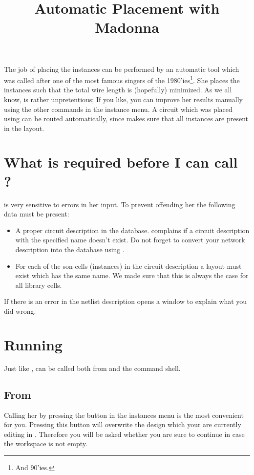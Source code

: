 \title{Automatic Placement with Madonna}
\maketitle
\label{madonna}
The job of placing the instances can be performed by an automatic tool which
was called after one of the most famous singers of the 1980'ies\footnote{And
90'ies.}. She places the instances such that the total wire length is
(hopefully) minimized. As we all know,  is rather unpretentious;
If you like, you can improve her results manually using the other commands in
the instance menu. A circuit which was placed using  can be routed
automatically, since  makes sure that all instances are present in the
layout.

\section{What is required before I can call \protect{}?}
 is very sensitive to errors in her input.
To prevent offending her the following data must be present:
\begin{itemize}
\item
A proper circuit description in the database. 
complains if a circuit description with the specified name
doesn't exist.
Do not forget to convert your
 network description into the database using .
\item
For each of the son-cells (instances) in the circuit description
a layout must exist which has the same name. We made sure that
this is always the case for all library cells.
\end{itemize}
If there is an error in the netlist description  opens a window to
explain what you did wrong.

\section{Running \protect{}} \label{s-run-madonna}
Just like ,  can be called both
from  and the command shell. 

\subsection{From \protect{}}
Calling her
by pressing the button  in the instances
menu is the most convenient for you.
Pressing this button will overwrite the design which
your are currently editing in . Therefore you will be
asked whether you are sure to continue in case the workspace
is not empty.

